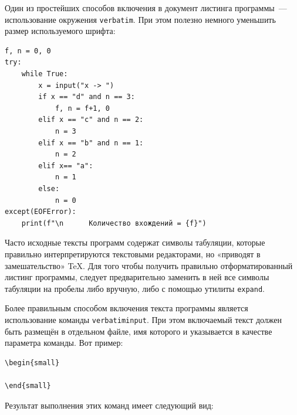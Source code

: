Один из простейших способов включения в документ листинга программы~--- 
использование окружения \verb|verbatim|. При этом полезно немного
уменьшить размер используемого шрифта:

\begin{small}
\begin{verbatim}
f, n = 0, 0
try:
    while True:
        x = input("x -> ")
        if x == "d" and n == 3:
            f, n = f+1, 0 
        elif x == "c" and n == 2:
            n = 3
        elif x == "b" and n == 1:
            n = 2
        elif x== "a":
            n = 1
        else:
            n = 0
except(EOFError):
    print(f"\n      Количество вхождений = {f}")
\end{verbatim}
\end{small}

Часто исходные тексты программ содержат символы табуляции, которые
правильно интерпретируются текстовыми редакторами, но «приводят в
замешательство» \TeX. Для того чтобы получить правильно отформатированный
листинг программы, следует предварительно заменить в ней все символы табуляции
на пробелы либо вручную, либо с помощью утилиты \verb|expand|.

Более правильным способом включения текста программы является использование
команды \verb|verbatiminput|. При этом
включаемый текст должен быть размещён в отдельном файле, имя которого и
указывается в качестве параметра команды. Вот пример:

\begin{small}
\begin{verbatim}
\begin{small}

\end{small}
\end{verbatim}
\end{small}

Результат выполнения этих команд имеет следующий вид:

\begin{small}

\end{small}


